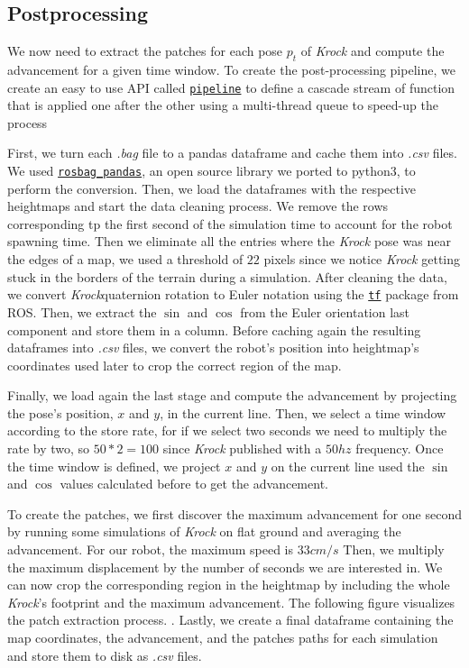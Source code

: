 \documentclass[../document.tex]{subfiles}
\begin{document}
\subsection{Postprocessing}
We now need to extract the patches for each pose $p_t$ of \emph{Krock} and compute the advancement for a given time window. To create the post-processing pipeline, we create an easy to use API called \href{https://github.com/FrancescoSaverioZuppichini/Master-Thesis/tree/master/core/utilities/pipeline}{\texttt{pipeline}} to define a cascade stream of function that is applied one after the other using a multi-thread queue to speed-up the process

First, we turn each \emph{.bag} file to a pandas dataframe and cache them into \emph{.csv} files. We used \href{https://github.com/aktaylor08/RosbagPandas}{\texttt{rosbag\_pandas}}, an open source library we ported to python3, to perform the conversion.
Then, we load the dataframes with the respective heightmaps and start the data cleaning process. We remove the rows corresponding tp the first second of the simulation time to account for the robot spawning time. Then we eliminate all the entries where the \emph{Krock} pose was near the edges of a map, we used a threshold of $22$ pixels since we notice  \emph{Krock} getting stuck in the borders of the terrain during a simulation. 
After cleaning the data, we convert \emph{Krock}quaternion rotation to Euler notation using the \href{https://duckduckgo.com/?q=ros+tf&atb=v154-1__&ia=web}{\texttt{tf}} package from ROS. Then, we extract the $\sin$ and $\cos$ from the Euler orientation last component and store them in a column.
Before caching again the resulting dataframes into \emph{.csv} files, we convert the robot's position into heightmap's coordinates used later to crop the correct region of the map.

Finally, we load again the last stage and compute the advancement by projecting the pose's position, $x$ and $y$, in the current line. Then, we select a time window according to the store rate, for if we select two seconds we need to multiply the rate by two, so $50*2=100$ since \emph{Krock} published with a $50hz$ frequency. Once the time window is defined, we project $x$ and $y$ on the current line used the $\sin$ and $\cos$ values calculated before to get the advancement.

To create the patches, we first discover the maximum advancement for one second by running some simulations of \emph{Krock} on flat ground and averaging the advancement. For our robot, the maximum speed is $33cm/s$ Then, we multiply the maximum displacement by the number of seconds we are interested in. We can now crop the corresponding region in the heightmap by including the whole \emph{Krock}'s footprint and the maximum advancement. The following figure visualizes the patch extraction process. 
. Lastly, we create a final dataframe containing the map coordinates, the advancement, and the patches paths for each simulation and store them to disk as \emph{.csv} files. 
\end{document}
